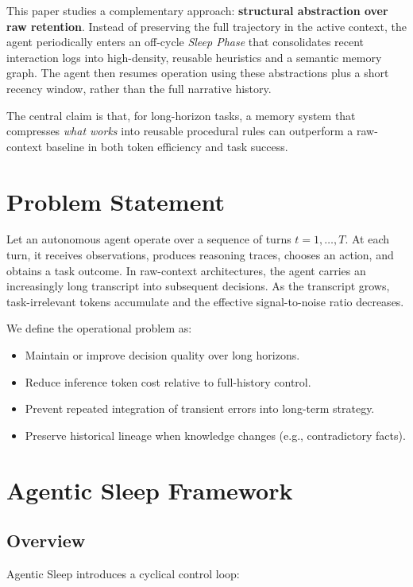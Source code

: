 \documentclass{article}
\begin{document}
This paper studies a complementary approach: \textbf{structural abstraction over raw retention}. Instead of preserving the full trajectory in the active context, the agent periodically enters an off-cycle \emph{Sleep Phase} that consolidates recent interaction logs into high-density, reusable heuristics and a semantic memory graph. The agent then resumes operation using these abstractions plus a short recency window, rather than the full narrative history.

The central claim is that, for long-horizon tasks, a memory system that compresses \emph{what works} into reusable procedural rules can outperform a raw-context baseline in both token efficiency and task success.

\section{Problem Statement}

Let an autonomous agent operate over a sequence of turns $t = 1, \dots, T$. At each turn, it receives observations, produces reasoning traces, chooses an action, and obtains a task outcome. In raw-context architectures, the agent carries an increasingly long transcript into subsequent decisions. As the transcript grows, task-irrelevant tokens accumulate and the effective signal-to-noise ratio decreases.

We define the operational problem as:

\begin{itemize}[leftmargin=1.25em]
\item Maintain or improve decision quality over long horizons.
\item Reduce inference token cost relative to full-history control.
\item Prevent repeated integration of transient errors into long-term strategy.
\item Preserve historical lineage when knowledge changes (e.g., contradictory facts).
\end{itemize}

\section{Agentic Sleep Framework}

\subsection{Overview}

Agentic Sleep introduces a cyclical control loop:
\end{document}
